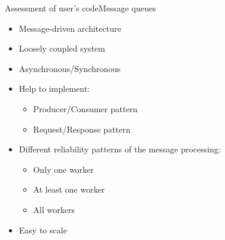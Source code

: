 \documentclass{beamer}
\begin{document}
\begin{frame}{Assessment of user's code}{Message queues}
  \begin{itemize}
    \item {
      Message-driven architecture
    }
    \item {
      Loosely coupled system
    }
    \item {
      \alert<2> {Asynchronous}/Synchronous 
    }
    \item {
      Help to implement:
      \begin{itemize}
        \item Producer/Consumer pattern
        \item \alert<2> {Request/Response pattern}
      \end{itemize}
    }
    \item {
      Different reliability patterns of the message processing:
      \begin{itemize}
        \item \alert<2> {Only one worker}
        \item At least one worker
        \item All workers
      \end{itemize}
    }
    \item {
      Easy to scale
    }
  \end{itemize}
\end{frame}
\end{document}
